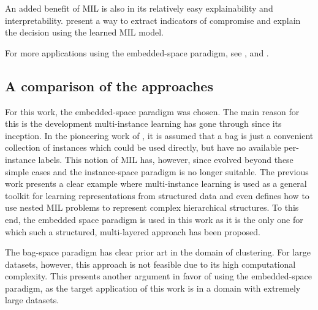 An added benefit of MIL is also in its relatively easy explainability and interpretability. \cite{pevny_nested_2020} present a way to extract indicators of compromise and explain the decision using the learned MIL model.

For more applications using the embedded-space paradigm, see \cite{cheplygina_multiple_2015}, \cite{chen_image_2004} \cite{foulds_learning_2008} and \cite{zhang_multi-instance_2009}.

\subsection{A comparison of the approaches}
For this work, the embedded-space paradigm was chosen. The main reason for this is the development multi-instance learning has gone through since its inception. In the pioneering work of \cite{dietterich_solving_1997}, it is assumed that a bag is just a convenient collection of instances which could be used directly, but have no available per-instance labels. This notion of MIL has, however, since evolved beyond these simple cases and the instance-space paradigm is no longer suitable. The previous work \cite{pevny_nested_2020} presents a clear example where multi-instance learning is used as a general toolkit for learning representations from structured data and even defines how to use nested MIL problems to represent complex hierarchical structures. To this end, the embedded space paradigm is used in this work as it is the only one for which such a structured, multi-layered approach has been proposed.

The bag-space paradigm has clear prior art in the domain of clustering. For large datasets, however, this approach is not feasible due to its high computational complexity. This presents another argument in favor of using the embedded-space paradigm, as the target application of this work is in a domain with extremely large datasets.
